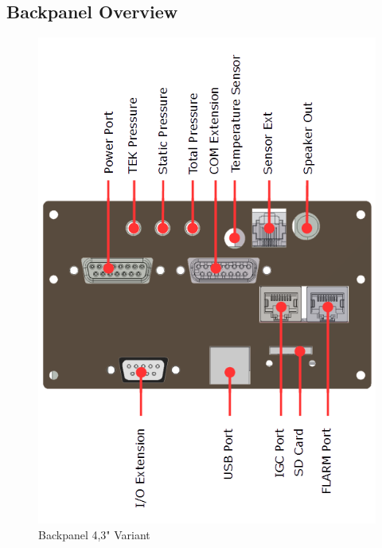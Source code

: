 \subsection{Backpanel Overview}

\begin{figure}[ht]
	\hspace*{-2cm}
	\includegraphics[width=0.95\linewidth]{figures/43_variant/backpanel_overview}
	\caption{Backpanel 4,3" Variant}
	\label{fig:backpanel_overview}
\end{figure}
\newpage

